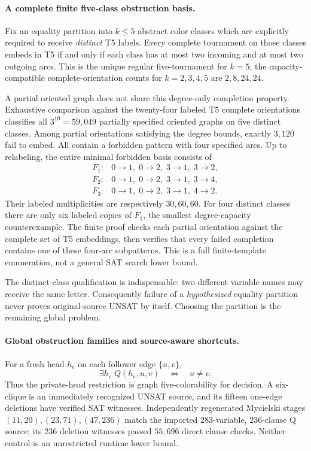 \documentclass[11pt]{article}
\begin{document}
\paragraph{A complete finite five-class obstruction basis.}
Fix an equality partition into $k\le5$ abstract color classes
which are explicitly required to receive \emph{distinct} T5 labels.
Every complete tournament on those classes embeds in T5 if and
only if each class has at most two incoming and at most two outgoing
arcs. This is the unique regular five-tournament for $k=5$;
the capacity-compatible complete-orientation counts for
$k=2,3,4,5$ are $2,8,24,24$.

A partial oriented graph does not share this degree-only
completion property. Exhaustive comparison against the twenty-four
labeled T5 complete orientations classifies all $3^{10}=59{,}049$
partially specified oriented graphs on five distinct classes.
Among partial orientations satisfying the degree bounds, exactly
$3{,}120$ fail to embed. All contain a forbidden pattern
with four specified arcs. Up to relabeling, the entire
minimal forbidden basis consists of
\[
\begin{array}{ll}
 F_1: & 0\to1,\;0\to2,\;3\to1,\;3\to2,\\
 F_2: & 0\to1,\;0\to2,\;3\to1,\;3\to4,\\
 F_3: & 0\to1,\;0\to2,\;3\to1,\;4\to2.
\end{array}
\]
Their labeled multiplicities are respectively $30,60,60$.
For four distinct classes there are only six labeled copies of
$F_1$, the smallest degree-capacity counterexample.
The finite proof checks each partial orientation against the
complete set of T5 embeddings, then verifies that every failed
completion contains one of these four-arc subpatterns.
This is a full finite-template enumeration, not a general
SAT search lower bound.

The distinct-class qualification is indispensable: two
different variable names may receive the same letter.
Consequently failure of a \emph{hypothesized} equality partition
never proves original-source UNSAT by itself.
Choosing the partition is the remaining global problem.

\paragraph{Global obstruction families and source-aware shortcuts.}
For a fresh head $h_e$ on each follower edge $\{u,v\}$,
\[
 \exists h_e\;Q(h_e,u,v)\quad\Longleftrightarrow\quad u\ne v.
\]
Thus the private-head restriction is graph five-colorability
for decision. A six-clique is an immediately recognized UNSAT
source, and its fifteen one-edge deletions have verified SAT
witnesses. Independently regenerated Mycielski stages
$(11,20),(23,71),(47,236)$ match the imported
$283$-variable, $236$-clause Q source; its $236$ deletion
witnesses passed $55{,}696$ direct clause checks.
Neither control is an unrestricted runtime lower bound.
\end{document}
